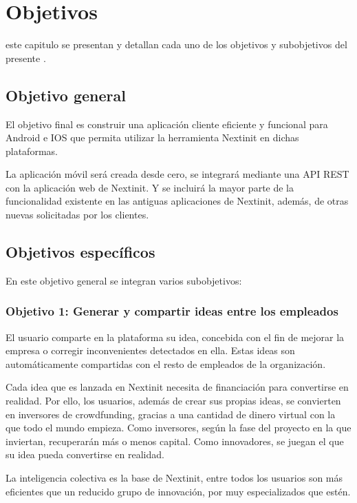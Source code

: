 \chapter{Objetivos}
\label{chap:objetivos}

 este capitulo se presentan y detallan cada uno de los objetivos y subobjetivos
del presente .

\section{Objetivo general}

El objetivo final es construir una aplicación cliente eficiente y funcional para Android e IOS
que permita utilizar la herramienta Nextinit en dichas plataformas.

La aplicación móvil será creada desde cero, se integrará mediante una API REST con la aplicación 
web de Nextinit. Y se incluirá la mayor parte de la funcionalidad existente en las antiguas 
aplicaciones de Nextinit, además, de otras nuevas solicitadas por los clientes.


\section{Objetivos específicos}

En este objetivo general se integran varios subobjetivos:

\subsection{Objetivo 1: Generar y compartir ideas entre los empleados}

El usuario comparte en la plataforma su idea, concebida con el fin de mejorar la empresa o corregir 
inconvenientes detectados en ella. Estas ideas son automáticamente compartidas con el resto de empleados
de la organización.

Cada idea que es lanzada en Nextinit necesita de financiación para convertirse en realidad. Por
ello, los usuarios, además de crear sus propias ideas, se convierten en inversores de crowdfunding,
gracias a una cantidad de dinero virtual con la que todo el mundo empieza. Como inversores,
según la fase del proyecto en la que inviertan, recuperarán más o menos capital. Como
innovadores, se juegan el que su idea pueda convertirse en realidad.

La inteligencia colectiva es la base de Nextinit, entre todos los usuarios son más eficientes que un 
reducido grupo de innovación, por muy especializados que estén.

